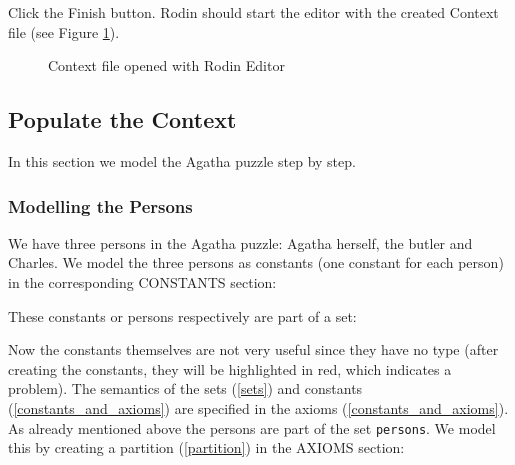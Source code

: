Click the \textsf{Finish} button. Rodin should start the editor with the created Context file (see Figure \ref{fig_tut_05_context_file}). 

\begin{figure}[h!t]
\begin{center}
	\caption{Context file opened with Rodin Editor}
	\label{fig_tut_05_context_file}
\end{center}
\end{figure}


\subsection{Populate the Context}
\label{tut_populate_context}

In this section we model the Agatha puzzle step by step.

\subsubsection{Modelling the Persons}
\label{tut_modelling_persons}

We have three persons in the Agatha puzzle: Agatha herself, the butler and Charles. We model the three persons as constants (one constant for each person) in the corresponding \textsf{CONSTANTS} section:


These constants or persons respectively are part of a set:


Now the constants themselves are not very useful since they have no type (after creating the constants, they will be highlighted in red, which indicates a problem). The semantics of the sets (\ref{sets}) and constants (\ref{constants_and_axioms}) are specified in the axioms (\ref{constants_and_axioms}). As already mentioned above the persons are part of the set \texttt{persons}. We model this by creating a partition (\ref{partition}) in the \textsf{AXIOMS} section: 

